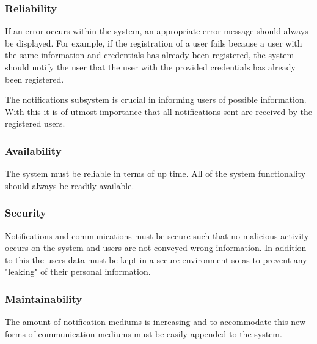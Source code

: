 \documentclass{article}
\begin{document}
\subsubsection{Reliability}    
    \begin{flushleft}
    If an error occurs within the system, an appropriate error message should always be displayed. For example, if the registration of a user fails because a user with the same information and credentials has already been registered, the system should notify the user that the user with the provided credentials has already been registered.
\bigskip

    The notifications subsystem is crucial in informing users of possible information. With this it is of utmost importance that all notifications sent are received by the registered users.
    \end{flushleft}
    
    	\subsubsection{Availability}    
    \begin{flushleft}
    The system must be reliable in terms of up time. All of the system functionality should always be readily available.
    \end{flushleft}
    
    	\subsubsection{Security}    
    \begin{flushleft}
    Notifications and communications must be secure such that no malicious activity occurs on the system and users are not conveyed wrong information. In addition to this the users data must be kept in a secure environment so as to prevent any "leaking" of their personal information.
    \end{flushleft}
    
    	\subsubsection{Maintainability}    
    \begin{flushleft}
    The amount of notification mediums is increasing and to accommodate this new forms of communication mediums must be easily appended to the system.
    \end{flushleft}
     \clearpage
     
\end{document}
